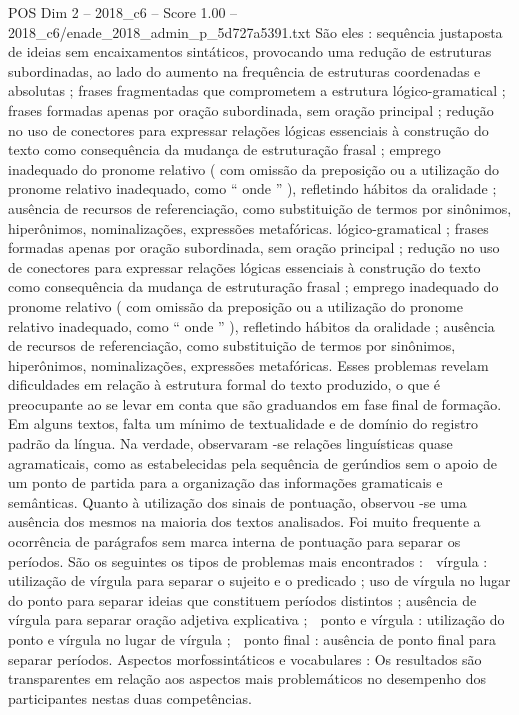 \begin{textsample}{POS Dim 2 – 2018\_c6 – Score 1.00 – 2018\_c6/enade\_2018\_admin\_p\_5d727a5391.txt}
São eles : sequência justaposta de ideias sem encaixamentos sintáticos, provocando uma redução de estruturas subordinadas, ao lado do aumento na frequência de estruturas coordenadas e absolutas ; frases fragmentadas que comprometem a estrutura lógico-gramatical ; frases formadas apenas por oração subordinada, sem oração principal ; redução no uso de conectores para expressar relações lógicas essenciais à construção do texto como consequência da mudança de estruturação frasal ; emprego inadequado do pronome relativo ( com omissão da preposição ou a utilização do pronome relativo inadequado, como “ onde ” ), refletindo hábitos da oralidade ; ausência de recursos de referenciação, como substituição de termos por sinônimos, hiperônimos, nominalizações, expressões metafóricas. lógico-gramatical ; frases formadas apenas por oração subordinada, sem oração principal ; redução no uso de conectores para expressar relações lógicas essenciais à construção do texto como consequência da mudança de estruturação frasal ; emprego inadequado do pronome relativo ( com omissão da preposição ou a utilização do pronome relativo inadequado, como “ onde ” ), refletindo hábitos da oralidade ; ausência de recursos de referenciação, como substituição de termos por sinônimos, hiperônimos, nominalizações, expressões metafóricas.
Esses problemas revelam dificuldades em relação à estrutura formal do texto produzido, o que é preocupante ao se levar em conta que são graduandos em fase final de formação.
Em alguns textos, falta um mínimo de textualidade e de domínio do registro padrão da língua.
Na verdade, observaram -se relações linguísticas quase agramaticais, como as estabelecidas pela sequência de gerúndios sem o apoio de um ponto de partida para a organização das informações gramaticais e semânticas.
Quanto à utilização dos sinais de pontuação, observou -se uma ausência dos mesmos na maioria dos textos analisados.
Foi muito frequente a ocorrência de parágrafos sem marca interna de pontuação para separar os períodos.
São os seguintes os tipos de problemas mais encontrados :  vírgula : utilização de vírgula para separar o sujeito e o predicado ; uso de vírgula no lugar do ponto para separar ideias que constituem períodos distintos ; ausência de vírgula para separar oração adjetiva explicativa ;  ponto e vírgula : utilização do ponto e vírgula no lugar de vírgula ;  ponto final : ausência de ponto final para separar períodos.
Aspectos morfossintáticos e vocabulares : Os resultados são transparentes em relação aos aspectos mais problemáticos no desempenho dos participantes nestas duas competências.

\end{textsample}
